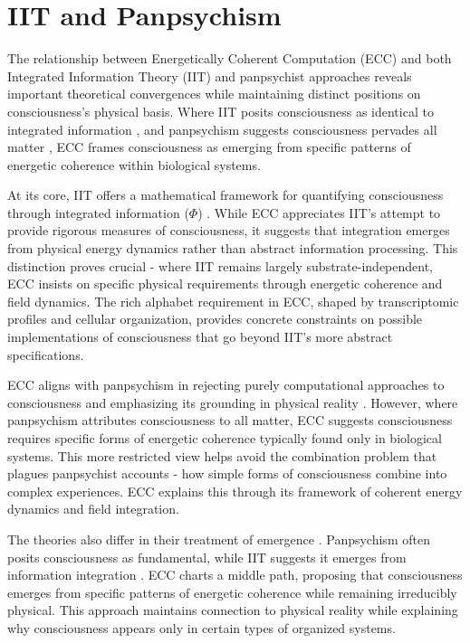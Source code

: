 \section{IIT and Panpsychism}


The relationship between Energetically Coherent Computation (ECC) and both Integrated Information Theory (IIT) and panpsychist approaches reveals important theoretical convergences while maintaining distinct positions on consciousness's physical basis. Where IIT posits consciousness as identical to integrated information \cite{Tononi2008}, and panpsychism suggests consciousness pervades all matter \cite{Strawson2006}, ECC frames consciousness as emerging from specific patterns of energetic coherence within biological systems.

At its core, IIT offers a mathematical framework for quantifying consciousness through integrated information ($\Phi$) \cite{Tononi2016}. While ECC appreciates IIT's attempt to provide rigorous measures of consciousness, it suggests that integration emerges from physical energy dynamics rather than abstract information processing. This distinction proves crucial - where IIT remains largely substrate-independent, ECC insists on specific physical requirements through energetic coherence and field dynamics. The rich alphabet requirement in ECC, shaped by transcriptomic profiles and cellular organization, provides concrete constraints on possible implementations of consciousness that go beyond IIT's more abstract specifications.

ECC aligns with panpsychism in rejecting purely computational approaches to consciousness and emphasizing its grounding in physical reality \cite{Nagel1979}. However, where panpsychism attributes consciousness to all matter, ECC suggests consciousness requires specific forms of energetic coherence typically found only in biological systems. This more restricted view helps avoid the combination problem that plagues panpsychist accounts \cite{Chalmers2015} - how simple forms of consciousness combine into complex experiences. ECC explains this through its framework of coherent energy dynamics and field integration.

The theories also differ in their treatment of emergence \cite{Goff2019}. Panpsychism often posits consciousness as fundamental, while IIT suggests it emerges from information integration \cite{Oizumi2014}. ECC charts a middle path, proposing that consciousness emerges from specific patterns of energetic coherence while remaining irreducibly physical. This approach maintains connection to physical reality while explaining why consciousness appears only in certain types of organized systems.

